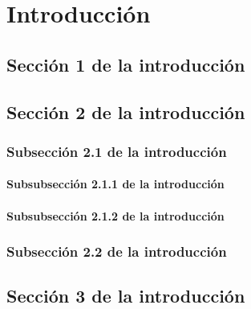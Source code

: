 \chapter{Introducción}
\Blindtext

\section{Sección 1 de la introducción}
\Blindtext

\section{Sección 2 de la introducción}
\Blindtext

\subsection{Subsección 2.1 de la introducción}
\blindtext

\subsubsection{Subsubsección 2.1.1 de la introducción}
\blindtext

\subsubsection{Subsubsección 2.1.2 de la introducción}
\blindtext

\subsection{Subsección 2.2 de la introducción}
\Blindtext

\section{Sección 3 de la introducción}
\Blindtext

